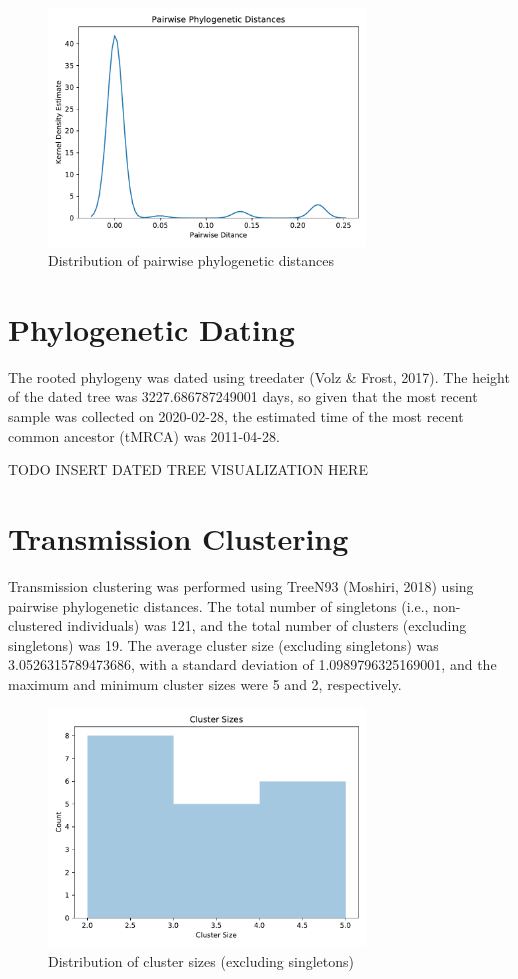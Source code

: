 \documentclass{article}
\begin{document}
\begin{figure}[h]
\centering
\includegraphics[width=0.75\textwidth]{./figs/pairwise_distances_tree.pdf}
\caption{Distribution of pairwise phylogenetic distances}
\end{figure}

\section{Phylogenetic Dating}
The rooted phylogeny was dated using treedater (Volz \& Frost, 2017).
The height of the dated tree was 3227.686787249001 days,
so given that the most recent sample was collected on 2020-02-28,
the estimated time of the most recent common ancestor (tMRCA) was 2011-04-28.


TODO INSERT DATED TREE VISUALIZATION HERE


\section{Transmission Clustering}
Transmission clustering was performed using TreeN93 (Moshiri, 2018) using pairwise phylogenetic distances.
The total number of singletons (i.e., non-clustered individuals) was 121,
and the total number of clusters (excluding singletons) was 19.
The average cluster size (excluding singletons) was 3.0526315789473686,
with a standard deviation of 1.0989796325169001,
and the maximum and minimum cluster sizes were 5 and 2, respectively.


\begin{figure}[h]
\centering
\includegraphics[width=0.75\textwidth]{./figs/cluster_sizes.pdf}
\caption{Distribution of cluster sizes (excluding singletons)}
\end{figure}
\end{document}
